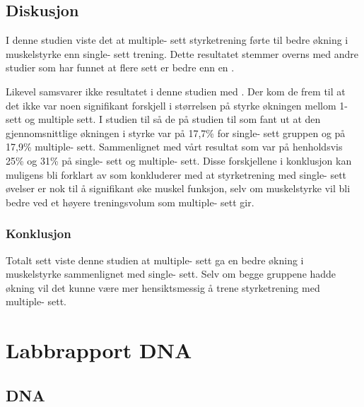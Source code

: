 \documentclass[
]{book}
\begin{document}
\hypertarget{diskusjon}{%
\section{Diskusjon}\label{diskusjon}}

I denne studien viste det at multiple- sett styrketrening førte til bedre økning i muskelstyrke enn single- sett trening. Dette resultatet stemmer overns med andre studier som har funnet at flere sett er bedre enn en \citep{galvão2005e, humburg2007c}.

Likevel samsvarer ikke resultatet i denne studien med \citep{carpinelli1998d}. Der kom de frem til at det ikke var noen signifikant forskjell i størrelsen på styrke økningen mellom 1- sett og multiple sett. I studien til \citep{carpinelli1998b} så de på studien til \citep{reid1987a} som fant ut at den gjennomsnittlige økningen i styrke var på 17,7\% for single- sett gruppen og på 17,9\% multiple- sett. Sammenlignet med vårt resultat som var på henholdsvis 25\% og 31\% på single- sett og multiple- sett. Disse forskjellene i konklusjon kan muligens bli forklart av \citep{galvão2005d} som konkluderer med at styrketrening med single- sett øvelser er nok til å signifikant øke muskel funksjon, selv om muskelstyrke vil bli bedre ved et høyere treningsvolum som multiple- sett gir.

\hypertarget{konklusjon}{%
\subsection{Konklusjon}\label{konklusjon}}

Totalt sett viste denne studien at multiple- sett ga en bedre økning i muskelstyrke sammenlignet med single- sett. Selv om begge gruppene hadde økning vil det kunne være mer hensiktsmessig å trene styrketrening med multiple- sett.

\hypertarget{labbrapport-dna}{%
\chapter{Labbrapport DNA}\label{labbrapport-dna}}

\hypertarget{dna}{%
\section{DNA}\label{dna}}
\end{document}
